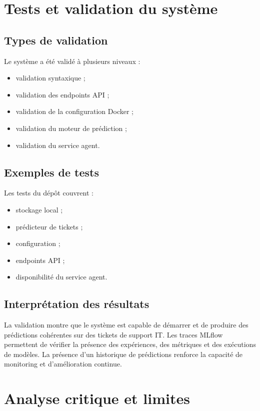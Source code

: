 \documentclass[11pt,a4paper]{report}
\begin{document}
\chapter{Tests et validation du système}
\section{Types de validation}
Le système a été validé à plusieurs niveaux :
\begin{itemize}[leftmargin=1.3em]
    \item validation syntaxique ;
    \item validation des endpoints API ;
    \item validation de la configuration Docker ;
    \item validation du moteur de prédiction ;
    \item validation du service agent.
\end{itemize}

\section{Exemples de tests}
Les tests du dépôt couvrent :
\begin{itemize}[leftmargin=1.3em]
    \item stockage local ;
    \item prédicteur de tickets ;
    \item configuration ;
    \item endpoints API ;
    \item disponibilité du service agent.
\end{itemize}

\section{Interprétation des résultats}
La validation montre que le système est capable de démarrer et de produire des prédictions cohérentes sur des tickets de support IT. Les traces MLflow permettent de vérifier la présence des expériences, des métriques et des exécutions de modèles. La présence d’un historique de prédictions renforce la capacité de monitoring et d’amélioration continue.

\chapter{Analyse critique et limites}
\end{document}
